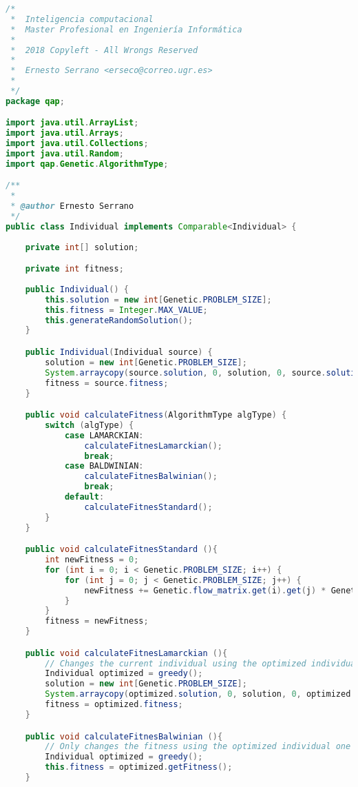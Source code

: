 \begin{lstlisting}[language=java,caption={Individual.java},captionpos=b]
/*  
 *  Inteligencia computacional
 *  Master Profesional en Ingeniería Informática
 * 
 *  2018 Copyleft - All Wrongs Reserved
 *
 *  Ernesto Serrano <erseco@correo.ugr.es>
 * 
 */
package qap;

import java.util.ArrayList;
import java.util.Arrays;
import java.util.Collections;
import java.util.Random;
import qap.Genetic.AlgorithmType;

/**
 * 
 * @author Ernesto Serrano
 */
public class Individual implements Comparable<Individual> {
        
    private int[] solution;

    private int fitness;
    
    public Individual() {
        this.solution = new int[Genetic.PROBLEM_SIZE];
        this.fitness = Integer.MAX_VALUE;
        this.generateRandomSolution();
    }

    public Individual(Individual source) {
        solution = new int[Genetic.PROBLEM_SIZE];
        System.arraycopy(source.solution, 0, solution, 0, source.solution.length);
        fitness = source.fitness;
    }

    public void calculateFitness(AlgorithmType algType) {
        switch (algType) {
            case LAMARCKIAN:
                calculateFitnesLamarckian();
                break;
            case BALDWINIAN:
                calculateFitnesBalwinian();
                break;
            default:
                calculateFitnesStandard();
        }
    }

    public void calculateFitnesStandard (){
        int newFitness = 0;
        for (int i = 0; i < Genetic.PROBLEM_SIZE; i++) {
            for (int j = 0; j < Genetic.PROBLEM_SIZE; j++) {                
                newFitness += Genetic.flow_matrix.get(i).get(j) * Genetic.distance_matrix.get(solution[i]).get(solution[j]);
            }
        }
        fitness = newFitness;
    }

    public void calculateFitnesLamarckian (){
        // Changes the current individual using the optimized individual values
        Individual optimized = greedy();
        solution = new int[Genetic.PROBLEM_SIZE];
        System.arraycopy(optimized.solution, 0, solution, 0, optimized.solution.length);
        fitness = optimized.fitness;
    }

    public void calculateFitnesBalwinian (){
        // Only changes the fitness using the optimized individual one
        Individual optimized = greedy();
        this.fitness = optimized.getFitness();
    }
    

\end{lstlisting}
